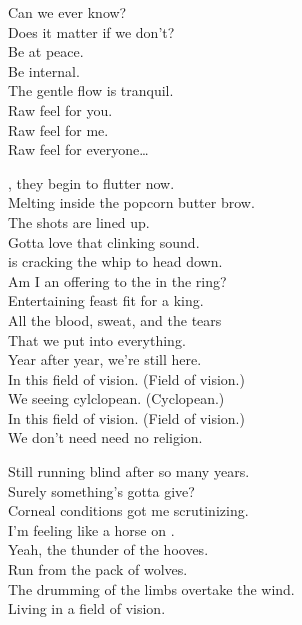 Can we ever know? \\
Does it matter if we don't? \\
Be at peace. \\
Be internal. \\
The gentle flow is tranquil. \\

Raw feel for you. \\
Raw feel for me. \\
Raw feel for everyone… \\




, they begin to flutter now. \\
Melting inside the popcorn butter brow. \\
The shots are lined up. \\
Gotta love that clinking sound. \\
 is cracking the whip to head down. \\

Am I an offering to the  in the ring? \\
Entertaining feast fit for a king. \\
All the blood, sweat, and the tears \\
That we put into everything. \\
Year after year, we're still here. \\

In this field of vision. (Field of vision.) \\
We seeing cylclopean. (Cyclopean.) \\
In this field of vision. (Field of vision.) \\
We don't need need no religion. \\


Still running blind after so many years. \\
Surely something's gotta give? \\
Corneal conditions got me scrutinizing. \\
I'm feeling like a horse on . \\

Yeah, the thunder of the hooves. \\
Run from the pack of wolves. \\
The drumming of the limbs overtake the wind. \\
Living in a field of vision. \\

